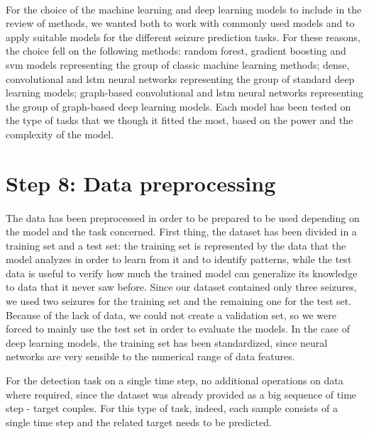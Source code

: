 \paragraph{} For the choice of the machine learning and deep learning models to include in the review of methods, we wanted both to work with commonly used models and to apply suitable models for the different seizure prediction tasks. For these reasons, the choice fell on the following methods: random forest, gradient boosting and \acs{svm} models representing the group of classic machine learning methods; dense, convolutional and \acs{lstm} neural networks representing the group of standard deep learning models; graph-based convolutional and \acs{lstm} neural networks representing the group of graph-based deep learning models. Each model has been tested on the type of tasks that we though it fitted the most, based on the power and the complexity of the model.


\section{Step 8: Data preprocessing} \label{sec: step_data_preprocessing}
\paragraph{} The data has been preprocessed in order to be prepared to be used depending on the model and the task concerned. First thing, the dataset has been divided in a training set and a test set: the training set is represented by the data that the model analyzes in order to learn from it and to identify patterns, while the test data is useful to verify how much the trained model can generalize its knowledge to data that it never saw before. Since our dataset contained only three seizures, we used two seizures for the training set and the remaining one for the test set. Because of the lack of data, we could not create a validation set, so we were forced to mainly use the test set in order to evaluate the models. In the case of deep learning models, the training set has been standardized, since neural networks are very sensible to the numerical range of data features.

For the detection task on a single time step, no additional operations on data where required, since the dataset was already provided as a big sequence of time step - target couples. For this type of task, indeed, each sample consists of a single time step and the related target needs to be predicted.


